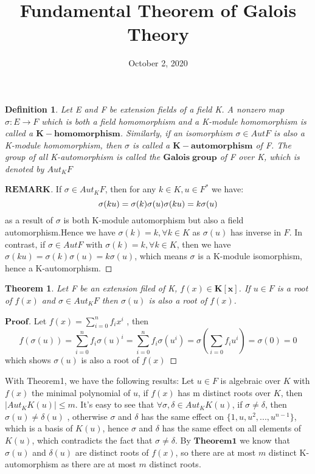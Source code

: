 \documentclass[a4paper, 11pt]{article}
\title{Fundamental Theorem of Galois Theory}
\date{October 2, 2020}
\newtheorem{difinition}{Definition}
\newtheorem{theorem}{Theorem}
\theoremstyle{remark}
\newenvironment{myremark}
{\renewcommand\qedsymbol{$ $}\begin{proof}[$\mathbf{REMARK}$]}
  {\end{proof}}
\newenvironment{myprf}
{\renewcommand\qedsymbol{$ $}\begin{proof}[$\mathbf{Proof}$]}
  {\end{proof}}
\theoremstyle{definition}
\begin{document}
    \maketitle
    \begin{difinition}
            Let E and F be extension fields of a field K. A nonzero map $\sigma:E\rightarrow F$ which is both a field homomorphism and a 
            K-module homomorphism is called a $\mathbf{K-homomorphism}$. Similarly, if an isomorphism $\sigma\in Aut F$ is also a 
            K-module homomorphism, then $\sigma$ is called a $\mathbf{K-automorphism}$ of F. The group of all K-automorphism 
            is called the $\mathbf{Galois\; group}$ of F over K, which is denoted by $Aut_K F$
    \end{difinition}
    \vspace{0.3cm}
    \begin{myremark}
            If $\sigma\in Aut_KF$, then for any $k\in K, u\in F^{*}$ we have:
            $$
            \sigma(ku)=\sigma(k)\sigma(u)\\
            \sigma(ku)=k\sigma(u)
            $$ as a result of $\sigma$ is both K-module automorphism but also a field automorphism.Hence we have $\sigma(k)=k, \forall k\in K$ as $\sigma(u)$ has inverse in $F$.
            In contrast, if $\sigma \in Aut F$ with $\sigma(k)=k, \forall k\in K$, then we have $\sigma(ku)=\sigma(k)\sigma(u)=k\sigma(u)$, which means $\sigma$ is a K-module isomorphism, hence a K-automorphism.
            
    \end{myremark}

    \vspace{0.5cm}
    \begin{theorem}
            Let F be an extension filed of K, $f(x)\in \mathbf{K[x]}$. If $u\in F$
            is a root of $f(x)$ and $\sigma \in Aut_K F$ then $\sigma(u)$ is also a root 
            of $f(x)$.
            
    \end{theorem}
    \vspace{0.3cm}
    \begin{myprf}
            Let $\displaystyle f(x)=\sum_{i=0}^{n}f_i x^i$ , then $$\displaystyle f(\sigma(u))=\sum_{i=0}^{n}f_i \sigma(u)^i
            = \sum_{i=0}^{n}f_i \sigma(u^i) = \sigma(\sum_{i=0}f_i u^i ) = \sigma(0)=0$$
            which shows $\sigma(u)$ is also a root of $f(x)$
    \end{myprf}
    \vspace{0.3cm}
    \indent With Theorem1, we have the following results: Let $u\in F$ is algebraic over $K$
    with $f(x)$ the minimal polynomial of $u$, if $f(x)$ has m distinct roots over $K$,
    then $|Aut_K K(u)|\leq m$. It's easy to see that $\forall \sigma, \delta \in Aut_K K(u)$,
    if $\sigma \neq \delta$, then $\sigma(u)\neq \delta(u)$ , otherwise $\sigma$ and $\delta$ has the same effect on $\{1, u, u^2,...,u^{n-1}\}$, which is a basis of $K(u)$, hence $\sigma$ and $\delta$ has the same effect on all elements of $K(u)$, which contradicts the fact that $\sigma\neq \delta$. By $\textbf{Theorem1}$ we know that $\sigma(u)$ and $\delta(u)$ are distinct roots of $f(x)$, so there are at most $m$ distinct K-automorphism as there are at most $m$ distinct roots.
\end{document}
